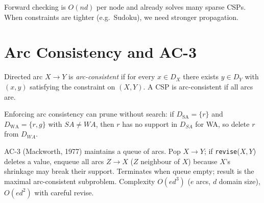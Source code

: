 Forward checking is $O(nd)$ per node and already solves many sparse CSPs. When constraints are tighter (e.g.\ Sudoku), we need stronger propagation.

\section{Arc Consistency and AC-3}
\label{sec:ac3}

\begin{definition}
Directed arc $X\to Y$ is \emph{arc-consistent} if for every $x\in D_X$ there exists $y\in D_Y$ with $(x,y)$ satisfying the constraint on $(X,Y)$. A CSP is arc-consistent if all arcs are.
\end{definition}

Enforcing arc consistency can prune without search: if $D_{\mathrm{SA}}=\{r\}$ and $D_{\mathrm{WA}}=\{r,g\}$ with $SA\neq WA$, then $r$ has no support in $D_{SA}$ for WA, so delete $r$ from $D_{WA}$.

AC-3 (Mackworth, 1977) maintains a queue of arcs. Pop $X\to Y$; if \texttt{revise}($X,Y$) deletes a value, enqueue all arcs $Z\to X$ ($Z$ neighbour of $X$) because $X$'s shrinkage may break their support. Terminates when queue empty; result is the maximal arc-consistent subproblem. Complexity $O(ed^3)$ ($e$ arcs, $d$ domain size), $O(ed^2)$ with careful revise.

